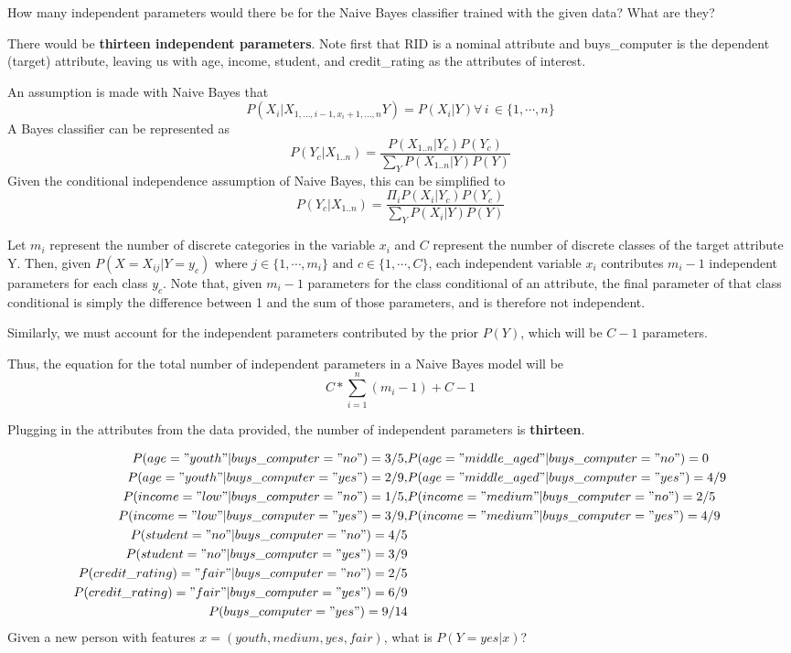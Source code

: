 \documentclass[11pt,largemargins]{homework}
\begin{document}
\begin{alphaparts}
	\questionpart How many independent parameters would there be for the Naive Bayes classifier trained with the given data? What are they?

	There would be \textbf{thirteen independent parameters}. Note first that RID is a nominal attribute and buys\_computer is the dependent (target) attribute, leaving us with age, income, student, and credit\_rating as the attributes of interest.

	An assumption is made with Naive Bayes that $$P(X_i|X_{1,\ldots,i-1, x_i+1, \ldots, n}Y)=P(X_i|Y)\forall\, i\,\in\{1, \cdots, n\}$$ 
	A Bayes classifier can be represented as
	$$P(Y_c|X_{1..n})=\frac{P(X_{1..n}|Y_c)P(Y_c)}{\sum_YP(X_{1..n}|Y)P(Y)}$$
	Given the conditional independence assumption of Naive Bayes, this can be simplified to
	$$P(Y_c|X_{1..n})=\frac{\Pi_iP(X_i|Y_c)P(Y_c)}{\sum_YP(X_i|Y)P(Y)}$$

	Let $m_i$ represent the number of discrete categories in the variable $x_i$ and $C$ represent the number of discrete classes of the target attribute Y. Then, given $P(X=X_{ij}|Y=y_c)$ where $j\in \{1, \cdots,m_i\}\text{ and }c\in\{1,\cdots,C\}$, each independent variable $x_i$ contributes $m_i-1$ independent parameters for each class $y_c$. Note that, given $m_i-1$ parameters for the class conditional of an attribute, the final parameter of that class conditional is simply the difference between 1 and the sum of those parameters, and is therefore not independent.
	
	Similarly, we must account for the independent parameters contributed by the prior $P(Y)$, which will be $C-1$ parameters.

	Thus, the equation for the total number of independent parameters in a Naive Bayes model will be
	$$C*\sum_{i=1}^n(m_i-1)+C-1$$

	Plugging in the attributes from the data provided, the number of independent parameters is \textbf{thirteen}.

	\questionpart
	{
		\tiny
		\begin{align*}
			P(age="youth"|buys\_computer="no")=3/5, &P(age="middle\_aged"|buys\_computer="no")=0\\
			P(age="youth"|buys\_computer="yes")=2/9, &P(age="middle\_aged"|buys\_computer="yes")=4/9\\
			P(income="low"|buys\_computer="no")=1/5, &P(income="medium"|buys\_computer="no")=2/5\\
			P(income="low"|buys\_computer="yes")=3/9, &P(income="medium"|buys\_computer="yes")=4/9\\
			P(student="no"|buys\_computer="no")=4/5\\
			P(student="no"|buys\_computer="yes")=3/9\\
			P(credit\_rating)="fair"|buys\_computer="no")=2/5\\
			P(credit\_rating)="fair"|buys\_computer="yes")=6/9\\
			P(buys\_computer="yes")=9/14
		\end{align*}
	}
	\questionpart Given a new person with features $x=(youth, medium, yes, fair)$, what is $P(Y=yes|x)$?


\end{alphaparts}
\end{document}
